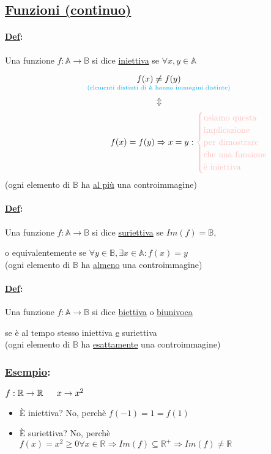 \documentclass{article}
\newcommand{\ul}[1]{\underline{#1}}
\newcommand{\A}{\mathbb{A}}
\newcommand{\B}{\mathbb{B}}
\newcommand{\R}{\mathbb{R}}
\newcommand{\Def}[2]{\paragraph{\ul{Def}:}#1\\\hspace*{3em}\begin{minipage}{.8\textwidth}#2\end{minipage}}
\newcommand{\Esempio}[1]{\subsubsection*{\ul{Esempio}:}#1}
\begin{document}
\subsection{\color{blue}\ul{Funzioni (continuo)}}
\Def{Una funzione $f:\A\rightarrow\B$ si dice \ul{iniettiva} se $\forall x,y\in\A$}{$$\underset{\text{\color{cyan}(elementi distinti di $\A$ hanno immagini distinte)}}{f(x)\not=f(y)}$$$$\Updownarrow$$$$\hspace*{8em}f(x)=f(y)\Rightarrow x=y:\color{pink}\begin{cases}\text{usiamo questa}\\\text{implicazione}\\\text{per dimostrare}\\\text{che una funzione}\\\text{è iniettiva}
\end{cases}$$\color{orange}(ogni elemento di $\B$ ha \ul{al più} una controimmagine)\color{none}}
\Def{Una funzione $f:\A\rightarrow\B$ si dice \ul{suriettiva} se $Im(f)=\B$,}{o equivalentemente se $\forall y\in\B,\exists x\in\A:f(x)=y$\\\color{orange}(ogni elemento di $\B$ ha \ul{almeno} una controimmagine)\color{none}}
\Def{Una funzione $f:\A\rightarrow\B$ si dice \ul{biettiva} o \ul{biunivoca}}{se è al tempo stesso iniettiva \ul{e} suriettiva\\\color{orange}(ogni elemento di $\B$ ha \ul{esattamente} una controimmagine)\color{none}}
\Esempio{$f:\R\rightarrow\R\\\hspace*{1.6em}x\rightarrow x^2$
	\begin{itemize}
		\item \color{cyan}È iniettiva? No, perchè $f(-1)=1=f(1)$\color{none}
		\item \color{violet}È suriettiva? No, perchè $f(x)=x^2\geq0\forall x\in\R\Rightarrow Im(f)\subseteq\R^+\Rightarrow Im(f)\not=\R$
\end{itemize}}
\vspace*{1em}
\end{document}
